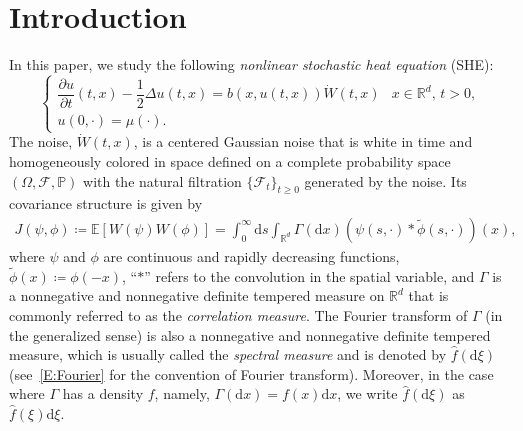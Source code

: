 \documentclass[sn-mathphys]{sn-jnl}%
\renewcommand{\R}{\mathbb{R}}
\newcommand{\E}{\mathbb{E}}
\newcommand{\ud}{\ensuremath{\mathrm{d}}}
\numberwithin{equation}{section}
\theoremstyle{thmstyleone}%
\theoremstyle{thmstyletwo}%
\theoremstyle{thmstylethree}%
\begin{document}




\maketitle

\tableofcontents

\section{Introduction}
In this paper, we study the following \textit{nonlinear stochastic heat equation} (SHE):
\begin{equation}\label{E:SHE}
    \begin{cases}
     \dfrac{\partial u}{\partial t}(t,x)-\dfrac{1}{2}\Delta u(t,x) = b(x,u(t,x))\dot W(t,x) & \text{$x\in \R^d$, $t>0$}, \\
     u(0,\cdot) = \mu(\cdot).
   \end{cases}
\end{equation}
The noise, $\dot{W}(t,x)$, is a centered Gaussian noise that is white in time and homogeneously
colored in space defined on a complete probability space $(\Omega, \mathcal{F}, \mathbb{P})$ with
the natural filtration $\{\mathcal{F}_t \}_{t\ge 0}$ generated by the noise. Its covariance
structure is given by
\begin{align}\label{E:Cor}
  J(\psi,\phi) \coloneqq \E \left[ W\left(\psi\right) W\left(\phi\right) \right]
  = \int_0^\infty \ud s \int_{\R^d} \Gamma(\ud x)(\psi(s,\cdot)*\widetilde{\phi}(s,\cdot))(x),
\end{align}
where $\psi$ and $\phi$ are continuous and rapidly decreasing functions, $\widetilde{\phi}(x)
\coloneqq \phi(-x)$, ``$*$'' refers to the convolution in the spatial variable, and $\Gamma$ is a
nonnegative and nonnegative definite tempered measure on $\R^d$ that is commonly referred to as the
\textit{correlation measure}. The Fourier transform of $\Gamma$ (in the generalized sense) is also a
nonnegative and nonnegative definite tempered measure, which is usually called the \textit{spectral
measure} and is denoted by $\widehat{f}(\ud \xi)$ (see~\eqref{E:Fourier} for the convention of
Fourier transform). Moreover, in the case where $\Gamma$ has a density $f$, namely, $\Gamma(\ud x) =
f(x) \ud x$, we write $\widehat{f}(\ud \xi)$ as $\widehat{f}(\xi) \ud \xi$.
\end{document}
